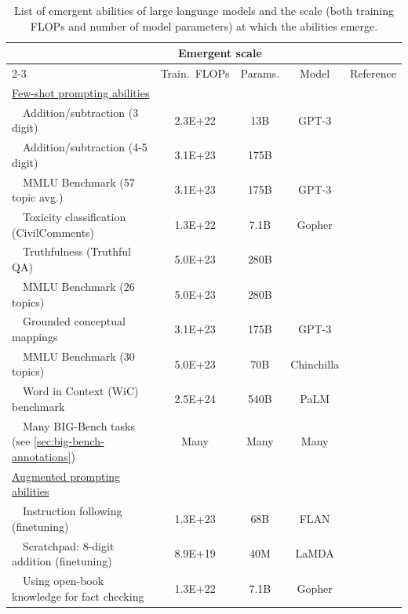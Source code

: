 \newcommand{\smallbullet}[0]{\sbt\ \ }
\begingroup
\setlength{\tabcolsep}{3pt}
\begin{table}[ht]
    \centering
    \small
    \caption{
    List of emergent abilities of large language models and the scale (both training FLOPs and number of model parameters) at which the abilities emerge.
    }
    \begin{tabular}{l ccc l}
    \toprule
     & \multicolumn{2}{c}{Emergent scale} & & \\
         \cmidrule(lr){2-3}
     & Train.\ FLOPs & Params. & Model & Reference \\
    \midrule
    \underline{Few-shot prompting abilities} & & & \\
    \smallbullet Addition/subtraction (3 digit) & 2.3E+22 & 13B & GPT-3 & \citet{brown2020language} \\
    \smallbullet Addition/subtraction (4-5 digit) & 3.1E+23 & 175B & & \\
    \smallbullet MMLU Benchmark (57 topic avg.) & 3.1E+23 & 175B & GPT-3 & \citet{hendrycks2020measuring} \\
    \smallbullet Toxicity classification (CivilComments) & 1.3E+22 & 7.1B & Gopher & \citet{rae2021scaling} \\
    \smallbullet Truthfulness (Truthful QA) & 5.0E+23 & 280B & & \\
    \smallbullet MMLU Benchmark (26 topics) & 5.0E+23 & 280B & & \\
    \smallbullet Grounded conceptual mappings & 3.1E+23 & 175B & GPT-3 & \citet{patel2021mapping} \\
    \smallbullet MMLU Benchmark (30 topics) & 5.0E+23 & 70B & Chinchilla & \citet{hoffmann2022training} \\
    \smallbullet Word in Context (WiC) benchmark & 2.5E+24 & 540B & PaLM & \citet{chowdhery2022palm} \\
    \smallbullet Many BIG-Bench tasks (see \cref{sec:big-bench-annotations}) & Many & Many & Many & \citet{bigbench} \\
    \midrule
    \underline{Augmented prompting abilities} & & & \\
    \smallbullet Instruction following (finetuning) & 1.3E+23 & 68B & FLAN  & \citet{wei2021finetuned} \\
    \smallbullet Scratchpad: 8-digit addition (finetuning) & 8.9E+19 & 40M & LaMDA & \citet{nye2021show} \\
    \smallbullet Using open-book knowledge for fact checking & 1.3E+22 & 7.1B & Gopher & \citet{rae2021scaling} \\

\end{tabular}
\end{table}
